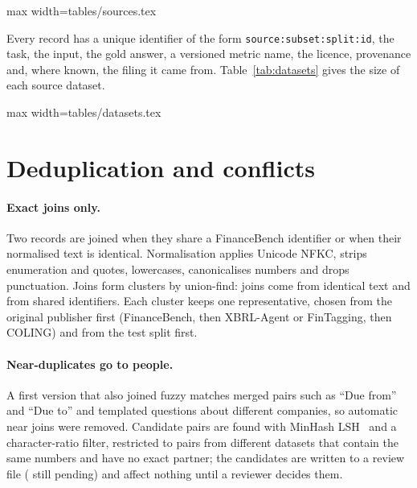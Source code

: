 \documentclass[10pt,twocolumn,a4paper]{article}
\makeatletter
\newcommand{\tabinput}[1]{\@@input #1 }
\makeatother
\begin{document}
\begin{table}[t]\centering\small
\caption{Sources, licences and number of pinned files.}\label{tab:sources}
\begin{adjustbox}{max width=\columnwidth}\tabinput{tables/sources.tex}\end{adjustbox}
\end{table}

Every record has a unique identifier of the form \texttt{source:subset:split:id}, the task, the input,
the gold answer, a versioned metric name, the licence, provenance and, where known, the filing it came
from. Table~\ref{tab:datasets} gives the size of each source dataset.

\begin{table}[t]\centering\small
\caption{Source datasets by task (before deduplication).}\label{tab:datasets}
\begin{adjustbox}{max width=\columnwidth}\tabinput{tables/datasets.tex}\end{adjustbox}
\end{table}

\section{Deduplication and conflicts}\label{sec:dedup}
\paragraph{Exact joins only.} Two records are joined when they share a FinanceBench identifier or
when their normalised text is identical. Normalisation applies Unicode NFKC, strips enumeration and
quotes, lowercases, canonicalises numbers and drops punctuation. Joins form clusters by union-find:
\nJoinExact{} joins come from identical text and \nJoinId{} from shared identifiers. Each cluster
keeps one representative, chosen from the original publisher first (FinanceBench, then
XBRL-Agent or FinTagging, then COLING) and from the test split first.

\paragraph{Near-duplicates go to people.} A first version that also joined fuzzy matches merged
pairs such as ``Due from'' and ``Due to'' and templated questions about different companies, so
automatic near joins were removed. Candidate pairs are found with MinHash LSH~\cite{broder1997minhash}
and a character-ratio filter, restricted to pairs from different datasets that contain the same
numbers and have no exact partner; the \nReview{} candidates are written to a review file
(\nReviewPending{} still pending) and affect nothing until a reviewer decides them.
\end{document}
